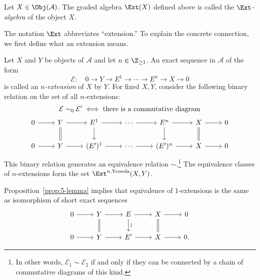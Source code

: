 \begin{definition}\label{def:Ext-algebra}
	Let $X\in\Obj(\mathcal{A})$. The graded algebra $\Ext(X)$ defined above
	is called the \emph{$\Ext$-algebra} of the object $X$.
\end{definition}

The notation $\Ext$ abbreviates “extension.” To explain the concrete
connection, we first define what an extension means.

\begin{definition}\label{def:Yoneda-Ext}
	Let $X$ and $Y$ be objects of $\mathcal{A}$ and let
	$n\in\Z_{\geq1}$. An exact sequence in $\mathcal{A}$ of the form
	\[ \mathcal{E}:\quad 0\to Y\to E^1\to\cdots\to E^n\to X\to0 \]
	is called an \emph{$n$-extension} of $X$ by $Y$. For fixed $X,Y$,
	consider the following binary relation on the set of all $n$-extensions:
	\begin{multline*} \mathcal{E} \sim_0 \mathcal{E}' \iff \text{there is a commutative diagram} \\
		\begin{tikzcd}[ampersand replacement=\&]
			0 \arrow[r] \& Y \arrow[r] \arrow[equal, d] \& E^1 \arrow[r] \arrow[d] \& \cdots \arrow[r] \& E^n \arrow[d] \arrow[r] \& X \arrow[equal, d] \arrow[r] \& 0 \\
			0 \arrow[r] \& Y \arrow[r] \& (E')^1 \arrow[r] \& \cdots \arrow[r] \& (E')^n \arrow[r] \& X \arrow[r] \& 0
		\end{tikzcd}\end{multline*}
	This binary relation generates an equivalence relation $\sim$.\footnote{In
	other words, $\mathcal{E}_1\sim\mathcal{E}_2$ if and only if they can be
	connected by a chain of commutative diagrams of this kind.} The
	equivalence classes of $n$-extensions form the set
	$\Ext^{n,\text{Yoneda}}(X,Y)$.
\end{definition}

Proposition~\ref{prop:5-lemma} implies that equivalence of $1$-extensions is
the same as isomorphism of short exact sequences
\[\begin{tikzcd}
	0 \arrow[r] & Y \arrow[r] \arrow[equal, d] & E \arrow[r] \arrow[d, "\sim" sloped] & X \arrow[equal, d] \arrow[r] & 0 \\
	0 \arrow[r] & Y \arrow[r] & E' \arrow[r] & X \arrow[r] & 0 .
\end{tikzcd}\]

